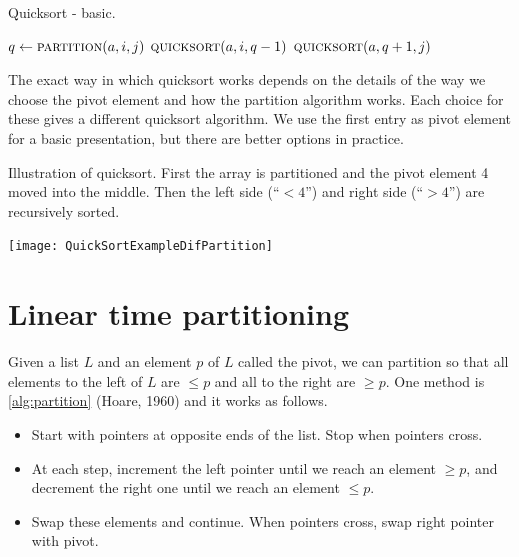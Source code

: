 \begin{algorithm}[H]
  \caption{Quicksort - basic.}    
  \label{alg:quicksort}
\begin{algorithmic}[0]
		        \State $q \gets  \Call{partition}{a, i,j}$ 
			\State $\Call{quicksort}{a,i,q-1}$ 
			\State $\Call{quicksort}{a,q+1,j}$ 
		\EndIf
	\EndFunction  
\end{algorithmic}
\end{algorithm}

The exact way in which quicksort works depends on the details of the way we choose the pivot element and how the 
partition algorithm works. Each choice for these gives a different quicksort algorithm.
We use the first entry as pivot element for a basic presentation, but there are better options in practice.

\begin{Boxample} \label{ex:quicksortSmall}
Illustration of quicksort. First the array is partitioned and the pivot element 4 moved into the middle. 
Then the left side (``$< 4$'') and right side (``$> 4$'') are recursively sorted.
\begin{center}
  \texttt{[image: QuickSortExampleDifPartition]}
\end{center}
\end{Boxample}


\section{Linear time partitioning}
Given a list $L$ and an element $p$ of $L$ called the pivot, we can partition so
 that all elements to the left of $L$ are $\leq p$ and all to the right are 
$\geq p$. One method is \cref{alg:partition} (Hoare, 1960) and it works as follows.
\begin{itemize}
\item Start with pointers at opposite ends of the list. Stop when pointers cross.
\item At each step, increment the left pointer until we reach an element $\geq p$, and decrement the right one until we reach an element $\leq p$. 
\item Swap these elements and continue. When pointers cross, swap right pointer with pivot.
\end{itemize}

